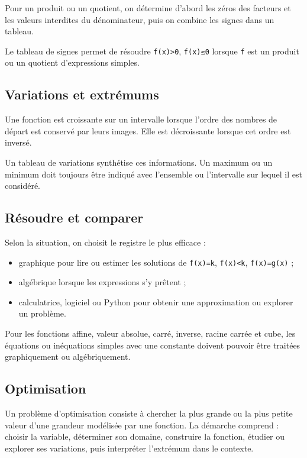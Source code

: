 Pour un produit ou un quotient, on détermine d'abord les zéros des facteurs et les valeurs interdites du dénominateur, puis on combine les signes dans un tableau.

Le tableau de signes permet de résoudre \texttt{f(x)>0}, \texttt{f(x)≤0} lorsque \texttt{f} est un produit ou un quotient d'expressions simples.

\subsection{Variations et extrémums}

Une fonction est croissante sur un intervalle lorsque l'ordre des nombres de départ est conservé par leurs images. Elle est décroissante lorsque cet ordre est inversé.

Un tableau de variations synthétise ces informations. Un maximum ou un minimum doit toujours être indiqué avec l'ensemble ou l'intervalle sur lequel il est considéré.

\subsection{Résoudre et comparer}

Selon la situation, on choisit le registre le plus efficace :

\begin{itemize}
\item graphique pour lire ou estimer les solutions de \texttt{f(x)=k}, \texttt{f(x)<k}, \texttt{f(x)=g(x)} ;
\item algébrique lorsque les expressions s'y prêtent ;
\item calculatrice, logiciel ou Python pour obtenir une approximation ou explorer un problème.
\end{itemize}

Pour les fonctions affine, valeur absolue, carré, inverse, racine carrée et cube, les équations ou inéquations simples avec une constante doivent pouvoir être traitées graphiquement ou algébriquement.

\subsection{Optimisation}

Un problème d'optimisation consiste à chercher la plus grande ou la plus petite valeur d'une grandeur modélisée par une fonction. La démarche comprend : choisir la variable, déterminer son domaine, construire la fonction, étudier ou explorer ses variations, puis interpréter l'extrémum dans le contexte.


